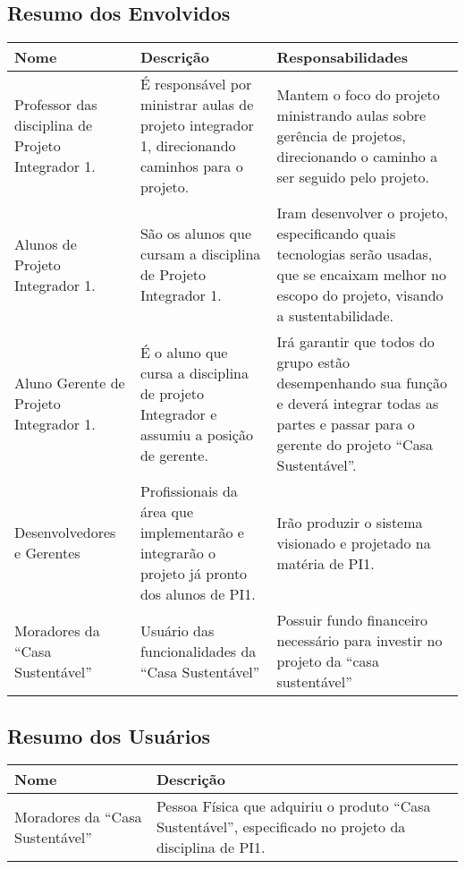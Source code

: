 \subsection{Resumo dos Envolvidos}

\begin{longtable}{|m{5cm}|m{5cm}|m{5cm}|}
	\hline \textbf{Nome} & \textbf{Descrição} & \textbf{Responsabilidades}\\
	\hline Professor das disciplina de Projeto Integrador 1. & É responsável por ministrar aulas de projeto integrador 1, direcionando caminhos para o projeto. & Mantem o foco do projeto ministrando aulas sobre gerência de projetos, direcionando o caminho a ser seguido pelo projeto. \\
	\hline Alunos de Projeto Integrador 1. & São os alunos que cursam a disciplina de Projeto Integrador 1. & Iram desenvolver o projeto, especificando quais tecnologias serão usadas, que se encaixam melhor no escopo do projeto, visando a sustentabilidade.\\
	\hline Aluno Gerente de Projeto Integrador 1. & É o aluno que cursa a disciplina de projeto Integrador e assumiu a posição de gerente. & Irá garantir que todos do grupo estão desempenhando sua função e deverá integrar todas as partes e passar para o gerente do projeto “Casa Sustentável”.\\
	\hline Desenvolvedores e Gerentes & Profissionais da área que implementarão e integrarão o projeto já pronto dos alunos de PI1. & Irão produzir o sistema visionado e projetado na matéria de PI1.\\
	\hline Moradores da “Casa Sustentável” & Usuário das funcionalidades da “Casa Sustentável” & Possuir fundo financeiro necessário para investir no projeto da “casa sustentável”\\
	\hline
\end{longtable}

\subsection{Resumo dos Usuários}

\begin{longtable}{|m{5cm}|m{10cm}|}
	\hline \textbf{Nome} & \textbf{Descrição}\\
	\hline Moradores da “Casa Sustentável” & Pessoa Física que adquiriu o produto “Casa Sustentável”, especificado no projeto da disciplina de PI1.\\
	\hline
\end{longtable}

